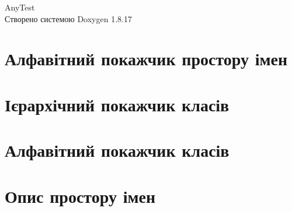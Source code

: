 \let\mypdfximage\pdfximage\def\pdfximage{\immediate\mypdfximage}\documentclass[twoside]{book}
\newcommand{\+}{\discretionary{\mbox{\scriptsize$\hookleftarrow$}}{}{}}
\newcommand{\clearemptydoublepage}{%
  \newpage{\pagestyle{empty}\cleardoublepage}%
}
\begin{document}
\hypersetup{pageanchor=false,
             bookmarksnumbered=true,
             pdfencoding=unicode
            }
\begin{titlepage}
\vspace*{7cm}
\begin{center}%
{\Large Any\+Test }\\
\vspace*{1cm}
{\large Створено системою Doxygen 1.8.17}\\
\end{center}
\end{titlepage}
\clearemptydoublepage
{}
\tableofcontents
\clearemptydoublepage
{}
\hypersetup{pageanchor=true}

\chapter{Алфавітний покажчик простору імен}

\chapter{Ієрархічний покажчик класів}

\chapter{Алфавітний покажчик класів}

\chapter{Опис простору імен}












\end{document}
